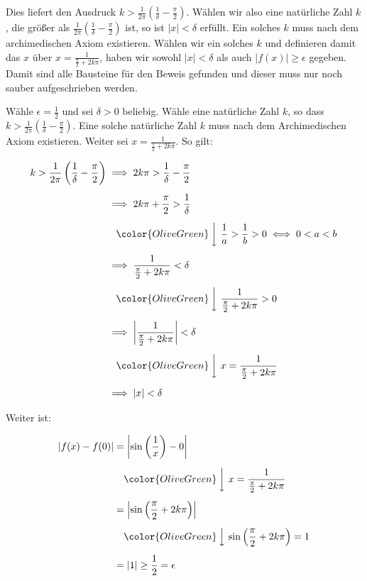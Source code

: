 \documentclass[fontsize=9pt,
               parskip=half-,
               DIV=14,
               listof=chapterentry,
               tocflat]{scrbook}
\newenvironment{indentblock}{\begin{adjustwidth}{.5cm}{}}{\end{adjustwidth}}
\begin{document}
\begin{solutionprocess*}
\begin{indentblock}
Dies liefert den Ausdruck $k>{\tfrac {1}{2\pi }}\left({\tfrac {1}{\delta }}-{\tfrac {\pi }{2}}\right)$. Wählen wir also eine natürliche Zahl $k$, die größer als ${\tfrac {1}{2\pi }}\left({\tfrac {1}{\delta }}-{\tfrac {\pi }{2}}\right)$ ist, so ist $|x|<\delta $ erfüllt. Ein solches $k$ muss nach dem archimedischen Axiom existieren. Wählen wir ein solches $k$ und definieren damit das $x$ über $x={\tfrac {1}{{\tfrac {\pi }{2}}+2k\pi }}$, haben wir sowohl $|x|<\delta $ als auch $|f(x)|\geq \epsilon $ gegeben. Damit sind alle Bausteine für den Beweis gefunden und dieser muss nur noch sauber aufgeschrieben werden.

\end{indentblock}

\end{solutionprocess*}

\begin{proof*}
Wähle $\epsilon ={\tfrac {1}{2}}$ und sei $\delta >0$ beliebig. Wähle eine natürliche Zahl $k$, so dass $k>{\tfrac {1}{2\pi }}\left({\tfrac {1}{\delta }}-{\tfrac {\pi }{2}}\right)$. Eine solche natürliche Zahl $k$ muss nach dem Archimedischen Axiom existieren. Weiter sei $x={\tfrac {1}{{\frac {\pi }{2}}+2k\pi }}$. So gilt:

\begin{align*}
k>{\frac {1}{2\pi }}\left({\frac {1}{\delta }}-{\frac {\pi }{2}}\right)&\implies 2k\pi >{\frac {1}{\delta }}-{\frac {\pi }{2}}\\[0.5em]&\implies 2k\pi +{\frac {\pi }{2}}>{\frac {1}{\delta }}\\[0.5em]&\quad {\color {OliveGreen}\left\downarrow \ {\frac {1}{a}}>{\frac {1}{b}}>0\iff 0<a<b\right.}\\[0.5em]&\implies {\frac {1}{{\frac {\pi }{2}}+2k\pi }}<\delta \\[0.5em]&\quad {\color {OliveGreen}\left\downarrow \ {\frac {1}{{\frac {\pi }{2}}+2k\pi }}>0\right.}\\[0.5em]&\implies \left|{\frac {1}{{\frac {\pi }{2}}+2k\pi }}\right|<\delta \\[0.5em]&\quad {\color {OliveGreen}\left\downarrow \ x={\frac {1}{{\frac {\pi }{2}}+2k\pi }}\right.}\\[0.5em]&\implies \left|x\right|<\delta 
\end{align*}

Weiter ist:

\begin{align*}
\left|f(x)-f(0)\right|&=\left|\sin \left({\frac {1}{x}}\right)-0\right|\\[0.5em]&\quad {\color {OliveGreen}\left\downarrow \ x={\frac {1}{{\frac {\pi }{2}}+2k\pi }}\right.}\\[0.5em]&=\left|\sin \left({\frac {\pi }{2}}+2k\pi \right)\right|\\[0.5em]&\quad {\color {OliveGreen}\left\downarrow \ \sin \left({\frac {\pi }{2}}+2k\pi \right)=1\right.}\\[0.5em]&=\left|1\right|\geq {\frac {1}{2}}=\epsilon 
\end{align*}


\end{proof*}
\end{document}
